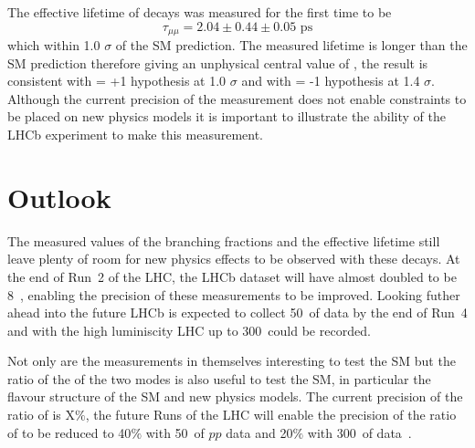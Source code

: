 The effective lifetime of \bsmumu decays was measured for the first time to be 
\begin{equation}
\tau_{\mu\mu} = 2.04 \pm 0.44 \pm 0.05 \text{ ps}
\end{equation}
which within 1.0 $\sigma$ of the SM prediction. The measured lifetime is longer than the SM prediction therefore giving an unphysical central value of \ADG, the result is consistent with \ADG = +1 hypothesis at 1.0 $\sigma$ and with \ADG = -1 hypothesis at 1.4 $\sigma$. Although the current precision of the measurement does not enable constraints to be placed on new physics models it is important to illustrate the ability of the LHCb experiment to make this measurement.


\section{Outlook}
The measured values of the branching fractions and the effective lifetime still leave plenty of room for new physics effects to be observed with these decays. At the end of Run~2 of the LHC, the LHCb dataset will have almost doubled to be 8~\fb, enabling the precision of these measurements to be improved. Looking futher ahead into the future LHCb is expected to collect 50~\fb of data by the end of Run~4 and with the high luminiscity LHC up to 300~\fb could be recorded. 

Not only are the \BF measurements in themselves interesting to test the SM but the ratio of the \BFs of the two modes is also useful to test the SM, in particular the flavour structure of the SM and new physics models. The current precision of the ratio of \BFs is X$\%$, the future Runs of the LHC will enable the precision of the ratio of \BFs to be reduced to 40$\%$ with 50~\fb of $pp$ data and 20$\%$ with 300~\fb of data~\cite{Aaij:2244311}. 

